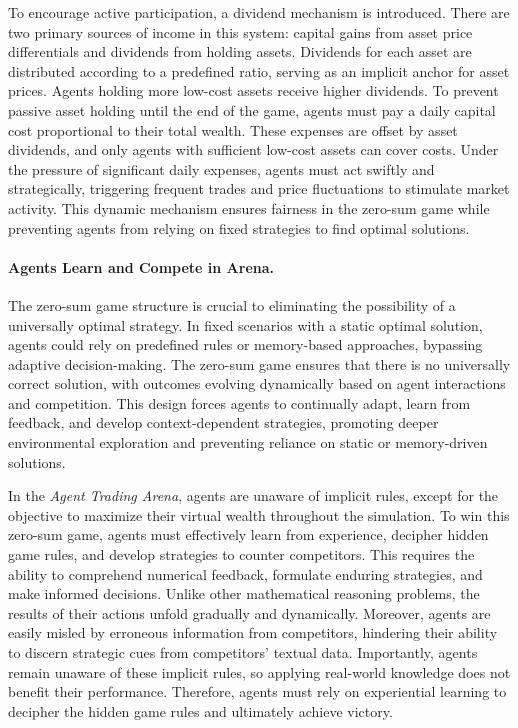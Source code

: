 To encourage active participation, a dividend mechanism is introduced. There are two primary sources of income in this system: capital gains from asset price differentials and dividends from holding assets. Dividends for each asset are distributed according to a predefined ratio, serving as an implicit anchor for asset prices. Agents holding more low-cost assets receive higher dividends. To prevent passive asset holding until the end of the game, agents must pay a daily capital cost proportional to their total wealth. These expenses are offset by asset dividends, and only agents with sufficient low-cost assets can cover costs. Under the pressure of significant daily expenses, agents must act swiftly and strategically, triggering frequent trades and price fluctuations to stimulate market activity. This dynamic mechanism ensures fairness in the zero-sum game while preventing agents from relying on fixed strategies to find optimal solutions.

\vspace{-3pt}

\paragraph{Agents Learn and Compete in Arena.}

The zero-sum game structure is crucial to eliminating the possibility of a universally optimal strategy. In fixed scenarios with a static optimal solution, agents could rely on predefined rules or memory-based approaches, bypassing adaptive decision-making. The zero-sum game ensures that there is no universally correct solution, with outcomes evolving dynamically based on agent interactions and competition. This design forces agents to continually adapt, learn from feedback, and develop context-dependent strategies, promoting deeper environmental exploration and preventing reliance on static or memory-driven solutions.

In the \textit{Agent Trading Arena}, agents are unaware of implicit rules, except for the objective to maximize their virtual wealth throughout the simulation. To win this zero-sum game, agents must effectively learn from experience, decipher hidden game rules, and develop strategies to counter competitors. This requires the ability to comprehend numerical feedback, formulate enduring strategies, and make informed decisions. Unlike other mathematical reasoning problems, the results of their actions unfold gradually and dynamically. Moreover, agents are easily misled by erroneous information from competitors, hindering their ability to discern strategic cues from competitors' textual data. Importantly, agents remain unaware of these implicit rules, so applying real-world knowledge does not benefit their performance. Therefore, agents must rely on experiential learning to decipher the hidden game rules and ultimately achieve victory.

